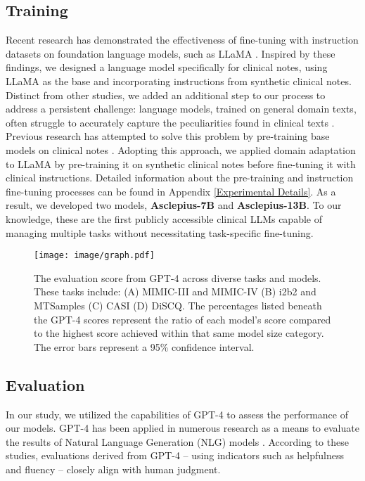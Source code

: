 \documentclass[11pt]{article}
\begin{document}
\subsection{Training}
Recent research \citep{alpaca,vicuna2023,geng2023koala,han2023medalpaca,yunxiang2023chatdoctor,toma2023clinical} has demonstrated the effectiveness of fine-tuning with instruction datasets on foundation language models, such as LLaMA \citep{touvron2023llama}. 
Inspired by these findings, we designed a language model specifically for clinical notes, using LLaMA as the base and incorporating instructions from synthetic clinical notes.
Distinct from other studies, we added an additional step to our process to address a persistent challenge: language models, trained on general domain texts, often struggle to accurately capture the peculiarities found in clinical texts \citep{laparra2020rethinking}.
Previous research has attempted to solve this problem by pre-training base models on clinical notes \citep{alsentzer2019publicly, lewis2020pretrained}. 
Adopting this approach, we applied domain adaptation to LLaMA by pre-training it on synthetic clinical notes before fine-tuning it with clinical instructions. 
Detailed information about the pre-training and instruction fine-tuning processes can be found in Appendix \ref{Experimental Details}.
As a result, we developed two models, \textbf{Asclepius-7B} and \textbf{Asclepius-13B}. 
To our knowledge, these are the first publicly accessible clinical LLMs capable of managing multiple tasks without necessitating task-specific fine-tuning.




\begin{figure*}[t]
\centering
\texttt{[image: image/graph.pdf]}
\caption{The evaluation score from GPT-4 across diverse tasks and models. These tasks include: (A) MIMIC-III and MIMIC-IV (B) i2b2 and MTSamples (C) CASI (D) DiSCQ. The percentages listed beneath the GPT-4 scores represent the ratio of each model's score compared to the highest score achieved within that same model size category. The error bars represent a 95\% confidence interval.}\label{fig:graph}
\end{figure*}


\subsection{Evaluation} \label{Evaluation}

In our study, we utilized the capabilities of GPT-4 to assess the performance of our models.
GPT-4 has been applied in numerous research as a means to evaluate the results of Natural Language Generation (NLG) models \citep{liu2023gpteval,vicuna2023}.
According to these studies, evaluations derived from GPT-4 – using indicators such as helpfulness and fluency – closely align with human judgment.
\end{document}

